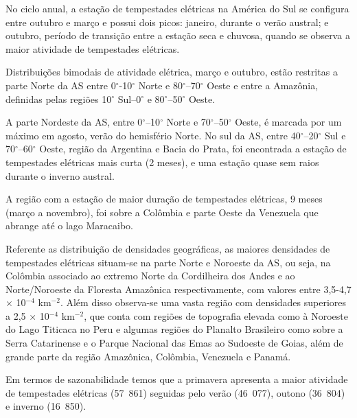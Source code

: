 
No ciclo anual, a estação de tempestades elétricas na América do Sul se configura entre outubro e março e possui dois picos: janeiro, durante o verão austral; e outubro, período de transição entre a estação seca e chuvosa, quando se observa a maior atividade de tempestades elétricas. 

Distribuições bimodais de atividade elétrica, março e outubro, estão restritas a parte Norte da AS entre 0$^{\circ}$-10$^{\circ}$ Norte e 80$^{\circ}$--70$^{\circ}$ Oeste e entre a Amazônia, definidas pelas regiões 10$^{\circ}$ Sul--0$^{\circ}$ e 80$^{\circ}$--50$^{\circ}$ Oeste. 

A parte Nordeste da AS, entre 0$^{\circ}$--10$^{\circ}$ Norte e 70$^{\circ}$--50$^{\circ}$ Oeste, é marcada por um máximo em agosto, verão do hemisfério Norte. No sul da AS,  entre 40$^{\circ}$--20$^{\circ}$ Sul e 70$^{\circ}$--60$^{\circ}$ Oeste, região da Argentina e Bacia do Prata, foi encontrada a estação de tempestades elétricas mais curta (2 meses), e uma estação quase sem raios durante o inverno austral.

A região com a estação de maior duração de tempestades elétricas,  9 meses (março a novembro), foi sobre a Colômbia e parte Oeste da Venezuela que abrange até o lago Maracaibo.  



Referente as distribuição de densidades geográficas, as maiores densidades de tempestades elétricas situam-se na parte Norte e Noroeste da AS, ou seja, na Colômbia associado ao extremo Norte da Cordilheira dos Andes e ao Norte/Noroeste da Floresta Amazônica respectivamente, com valores entre 3,5-4,7 $\times$ 10$^{-4}$ km$^{-2}$. Além disso observa-se uma vasta região com densidades superiores a  2,5 $\times$ 10$^{-4}$ km$^{-2}$, que conta com regiões de topografia elevada como à Noroeste do Lago Titicaca no Peru e algumas regiões do Planalto Brasileiro como sobre a Serra Catarinense e o Parque Nacional das Emas ao Sudoeste de Goias, além de grande parte da região Amazônica, Colômbia, Venezuela e Panamá.  

Em termos de sazonabilidade temos que a primavera apresenta a maior atividade de tempestades elétricas (57~861) seguidas pelo verão (46~077), outono (36~804) e inverno (16~850). 

